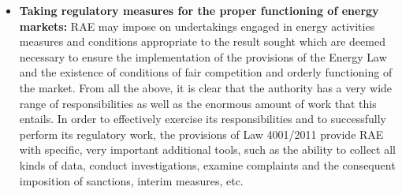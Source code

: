 \begin{itemize}
\item{\textbf{Taking regulatory measures for the proper functioning of energy markets:}}
RAE may impose on undertakings engaged in energy activities measures and conditions appropriate to the result sought which are deemed necessary to ensure the implementation of the provisions of the Energy Law and the existence of conditions of fair competition and orderly functioning of the market. From all the above, it is clear that the authority has a very wide range of responsibilities as well as the enormous amount of work that this entails. In order to effectively exercise its responsibilities and to successfully perform its regulatory work, the provisions of Law 4001/2011 provide RAE with specific, very important additional tools, such as the ability to collect all kinds of data, conduct investigations, examine complaints and the consequent imposition of sanctions, interim measures, etc.
\end{itemize}
